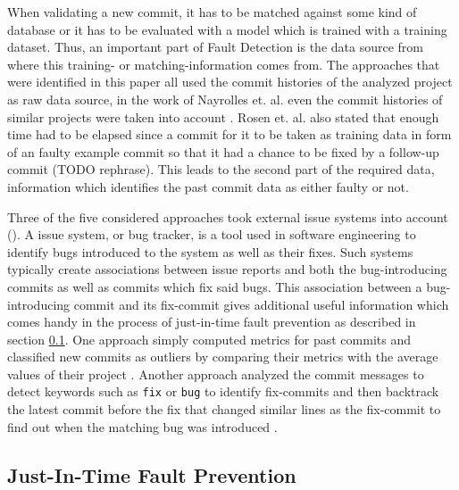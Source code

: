 When validating a new commit, it has to be matched against some kind of database or it has to be evaluated with a model which is trained with a training dataset. Thus, an important part of Fault Detection is the data source from where this training- or matching-information comes from. The approaches that were identified in this paper all used the commit histories of the analyzed project as raw data source, in the work of Nayrolles et. al. even the commit histories of similar projects were taken into account \cite{Nayrolles2018}. Rosen et. al. also stated that enough time had to be elapsed since a commit for it to be taken as training data in form of an faulty example commit so that it had a chance to be fixed by a follow-up commit \cite{Rosen2015} (TODO rephrase). This leads to the second part of the required data, information which identifies the past commit data as either faulty or not. 

Three of the five considered approaches took external issue systems into account (\cite{Nayrolles2018, Yang2015, Kamei2013}). A issue system, or bug tracker, is a tool used in software engineering to identify bugs introduced to the system as well as their fixes. Such systems typically create associations between issue reports and both the bug-introducing commits as well as commits which fix said bugs. This association between a bug-introducing commit and its fix-commit gives additional useful information which comes handy in the process of just-in-time fault prevention as described in section \ref{sec:faultprevention}.
One approach simply computed metrics for past commits and classified new commits as outliers by comparing their metrics with the average values of their project \cite{Goyal2017}. Another approach analyzed the commit messages to detect keywords such as \texttt{fix} or \texttt{bug} to identify fix-commits and then backtrack the latest commit before the fix that changed similar lines as the fix-commit to find out when the matching bug was introduced \cite{Rosen2015}.

\subsection{Just-In-Time Fault Prevention}
\label{sec:faultprevention}

